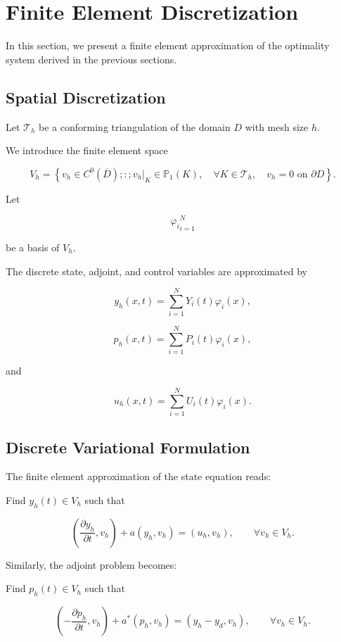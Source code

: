 \section{Finite Element Discretization}

In this section, we present a finite element approximation of the optimality system derived in the 
previous sections.

\subsection{Spatial Discretization}

Let \(\mathcal T_h\) be a conforming triangulation of the domain \(D\) with mesh size \(h\).

We introduce the finite element space

\[
V_h
=
\left\{
v_h\in C^0(\overline D)
;:;
v_h|_K \in \mathbb P_1(K),
\quad
\forall K\in\mathcal T_h,
\quad
v_h=0 \text{ on } \partial D
\right\}.
\]

Let

\[
{\varphi_i}_{i=1}^{N}
\]

be a basis of \(V_h\).

The discrete state, adjoint, and control variables are approximated by

\[
y_h(x,t)
=
\sum_{i=1}^{N}
Y_i(t)\varphi_i(x),
\]

\[
p_h(x,t)
=
\sum_{i=1}^{N}
P_i(t)\varphi_i(x),
\]

and

\[
u_h(x,t)
=
\sum_{i=1}^{N}
U_i(t)\varphi_i(x).
\]

\subsection{Discrete Variational Formulation}

The finite element approximation of the state equation reads:

Find \(y_h(t)\in V_h\) such that

\begin{equation}
\left(
\frac{\partial y_h}{\partial t},
v_h
\right)
+
a(y_h,v_h)
=
(u_h,v_h),
\qquad
\forall v_h\in V_h.
\label{eq:state_discrete}
\end{equation}

Similarly, the adjoint problem becomes:

Find \(p_h(t)\in V_h\) such that

\begin{equation}
\left(
-\frac{\partial p_h}{\partial t},
v_h
\right)
+
a^\ast(p_h,v_h)
=
(y_h-y_d,v_h),
\qquad
\forall v_h\in V_h.
\label{eq:adjoint_discrete}
\end{equation}

